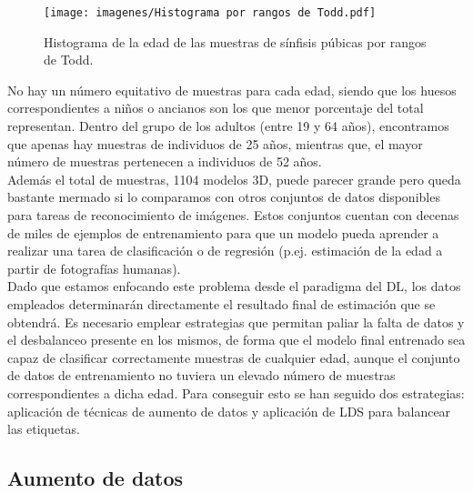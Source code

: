 \begin{figure}[ht]
    \centering
    \texttt{[image: imagenes/Histograma por rangos de Todd.pdf]}
    \caption{Histograma de la edad de las muestras de sínfisis púbicas por rangos de Todd.}
    \label{fig:histogramaTodd}
\end{figure}

No hay un número equitativo de muestras para cada edad, siendo que los huesos correspondientes a niños o ancianos son los que menor porcentaje del total representan. Dentro del grupo de los adultos (entre 19 y 64 años), encontramos que apenas hay muestras de individuos de 25 años, mientras que, el mayor número de muestras pertenecen a individuos de 52 años.\\

Además el total de muestras, 1104 modelos 3D, puede parecer grande pero queda bastante mermado si lo comparamos con otros conjuntos de datos disponibles para tareas de reconocimiento de imágenes. Estos conjuntos cuentan con decenas de miles de ejemplos de entrenamiento para que un modelo pueda aprender a realizar una tarea de clasificación o de regresión (p.ej. estimación de la edad a partir de fotografías humanas).\\

Dado que estamos enfocando este problema desde el paradigma del DL, los datos empleados determinarán directamente el resultado final de estimación que se obtendrá. Es necesario emplear estrategias que permitan paliar la falta de datos y el desbalanceo presente en los mismos, de forma que el modelo final entrenado sea capaz de clasificar correctamente muestras de cualquier edad, aunque el conjunto de datos de entrenamiento no tuviera un elevado número de muestras correspondientes a dicha edad. Para conseguir esto se han seguido dos estrategias: aplicación de técnicas de aumento de datos y aplicación de LDS para balancear las etiquetas.


\subsection{Aumento de datos}

